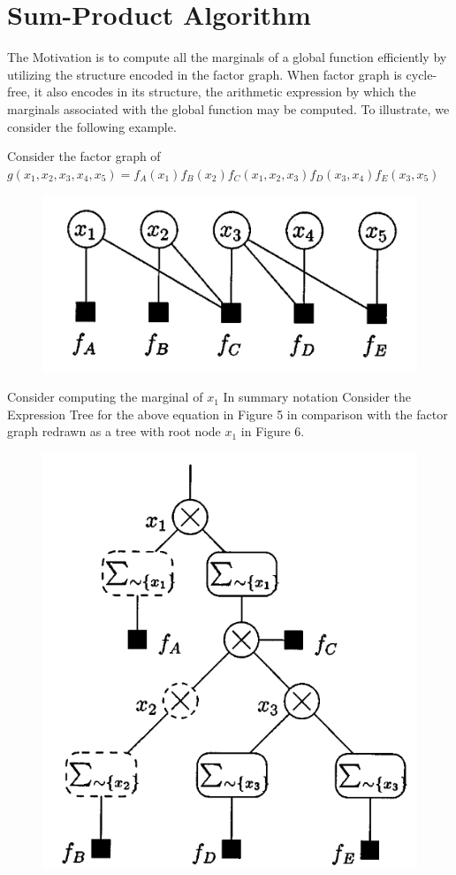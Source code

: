 \documentclass[letterpaper,english,10pt]{article}
\begin{document}
\section{Sum-Product Algorithm}
The Motivation is to compute all the marginals of a global function efficiently by utilizing the structure encoded in the factor graph.
When factor graph is cycle-free, it also encodes in its structure, the arithmetic expression by which the marginals associated with the
global function may be computed.
To illustrate, we consider the following example.
\begin{exmp}
Consider the factor graph of $g(x_1,x_2,x_3,x_4,x_5) = f_A(x_1)f_B(x_2)f_C(x_1,x_2,x_3)f_D(x_3,x_4)f_E(x_3,x_5)$
\begin{figure}[htb]
\centering
\includegraphics[width=0.25\linewidth]{exmpl_4.png}
\end{figure}
Consider computing the marginal of $x_1$
In summary notation
Consider the Expression Tree for the above equation in Figure 5 in comparison with the factor graph redrawn as a tree with root node $x_1$
in Figure 6.
\begin{figure}[htb]
\centering
\begin{minipage}[t]{.5\textwidth}
  \centering
  \includegraphics[width=.5\linewidth]{exmpl_5_pic_1.png}

\end{minipage}
\end{figure}
\end{exmp}
\end{document}
